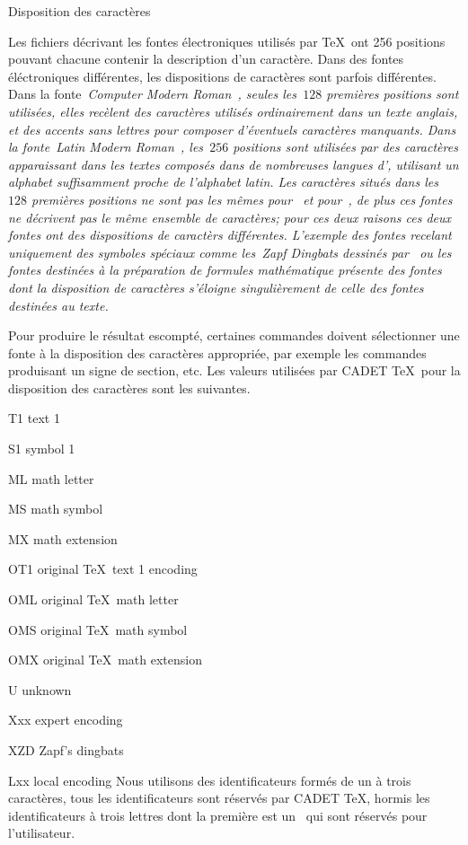 \formalpar Disposition des caractères

Les fichiers décrivant les fontes électroniques utilisés par \TeX\ ont
256 positions pouvant chacune contenir la description d'un
caractère. Dans des fontes éléctroniques différentes, les dispositions
de caractères sont parfois différentes. Dans la fonte~\em{Computer
Modern Roman}~, seules les~$128$ premières positions sont
utilisées, elles recèlent des caractères utilisés ordinairement dans
un texte anglais, et des accents sans lettres pour composer
d'éventuels caractères manquants. Dans la fonte~\em{Latin Modern
Roman}~, les~$256$ positions sont utilisées par des
caractères apparaissant dans les textes composés dans de nombreuses
langues d', utilisant un alphabet suffisamment proche de
l'alphabet latin. Les caractères situés dans les~$128$ premières
positions ne sont pas les mêmes pour~ et
pour~, de plus ces fontes ne décrivent pas le même
ensemble de caractères; pour ces deux raisons ces deux fontes ont des
dispositions de caractèrs différentes. L'exemple des fontes recelant
uniquement des symboles spéciaux comme les~\em{Zapf Dingbats} dessinés
par~ ou les fontes destinées à la préparation de formules
mathématique présente des fontes dont la disposition de caractères
s'éloigne singulièrement de celle des fontes destinées au texte.

Pour produire le résultat escompté, certaines commandes doivent
sélectionner une fonte à la disposition des caractères appropriée, par
exemple les commandes produisant un signe de section, etc. Les valeurs
utilisées par CADET \TeX\ pour la disposition des caractères sont les
suivantes.
\beginlist\tag
\item{T1}	text 1
\item{S1}	symbol 1
\item{ML}	math letter
\item{MS}	math symbol
\item{MX}	math extension
\smallskip
\item{OT1}	original \TeX\ text 1 encoding
\item{OML}	original \TeX\ math letter
\item{OMS}	original \TeX\ math symbol
\item{OMX}	original \TeX\ math extension
\smallskip
\item{U}	unknown
\item{Xxx}	expert encoding
\item{XZD}	Zapf's dingbats
\item{Lxx}	local encoding
\endlist
Nous utilisons des identificateurs formés de un à trois caractères,
tous les identificateurs sont réservés par CADET \TeX, hormis les
identificateurs à trois lettres dont la première est un~ qui
sont réservés pour l'utilisateur.


